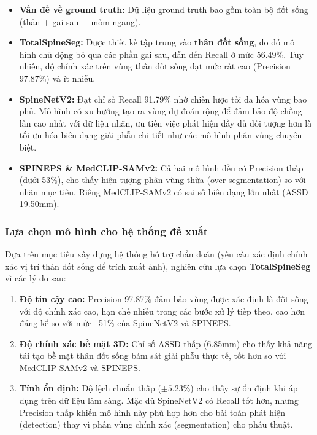 \begin{itemize}
    \item \textbf{Vấn đề về ground truth:} Dữ liệu ground truth bao gồm toàn bộ đốt sống (thân + gai sau + mỏm ngang).
    \item \textbf{TotalSpineSeg:} Được thiết kế tập trung vào \textbf{thân đốt sống}, do đó mô hình chủ động bỏ qua các phần gai sau, dẫn đến Recall ở mức 56.49\%. Tuy nhiên, độ chính xác trên vùng thân đốt sống đạt mức rất cao (Precision 97.87\%) và ít nhiễu.
    \item \textbf{SpineNetV2:} Đạt chỉ số Recall 91.79\% nhờ chiến lược tối đa hóa vùng bao phủ. Mô hình có xu hướng tạo ra vùng dự đoán rộng để đảm bảo độ chồng lấn cao nhất với dữ liệu nhãn, ưu tiên việc phát hiện đầy đủ đối tượng hơn là tối ưu hóa biên dạng giải phẫu chi tiết như các mô hình phân vùng chuyên biệt.
    \item \textbf{SPINEPS \& MedCLIP-SAMv2:} Cả hai mô hình đều có Precision thấp (dưới 53\%), cho thấy hiện tượng phân vùng thừa (over-segmentation) so với nhãn mục tiêu. Riêng MedCLIP-SAMv2 có sai số biên dạng lớn nhất (ASSD 19.50mm).
\end{itemize}
\subsubsection{Lựa chọn mô hình cho hệ thống đề xuất}
Dựa trên mục tiêu xây dựng hệ thống hỗ trợ chẩn đoán (yêu cầu xác định chính xác vị trí thân đốt sống để trích xuất ảnh), nghiên cứu lựa chọn \textbf{TotalSpineSeg} vì các lý do sau:

\begin{enumerate}
    \item \textbf{Độ tin cậy cao:} Precision 97.87\% đảm bảo vùng được xác định là đốt sống với độ chính xác cao, hạn chế nhiễu trong các bước xử lý tiếp theo, cao hơn đáng kể so với mức ~51\% của SpineNetV2 và SPINEPS.
    \item \textbf{Độ chính xác bề mặt 3D:} Chỉ số ASSD thấp (6.85mm) cho thấy khả năng tái tạo bề mặt thân đốt sống bám sát giải phẫu thực tế, tốt hơn so với MedCLIP-SAMv2 và SPINEPS.
    \item \textbf{Tính ổn định:} Độ lệch chuẩn thấp ($\pm 5.23\%$) cho thấy sự ổn định khi áp dụng trên dữ liệu lâm sàng. Mặc dù SpineNetV2 có Recall tốt hơn, nhưng Precision thấp khiến mô hình này phù hợp hơn cho bài toán phát hiện (detection) thay vì phân vùng chính xác (segmentation) cho phẫu thuật.
\end{enumerate}

